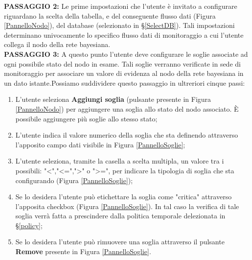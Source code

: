 \pagebreak

\textbf{PASSAGGIO 2:} Le prime impostazioni che l'utente è invitato a configurare riguardano la scelta della tabella, e del conseguente flusso dati (Figura \ref{PannelloNodo}), del database (selezionato in §\ref{SelectDB}). Tali impostazioni determinano univocamente lo specifico flusso dati di monitoraggio a cui l'utente collega il nodo della rete bayesiana.
~\\

\textbf{PASSAGGIO 3:} A questo punto l'utente deve configurare le soglie associate ad ogni possibile stato del nodo in esame. Tali soglie verranno verificate in sede di monitoraggio per associare un valore di evidenza al nodo della rete bayesiana in un dato istante.Possiamo suddividere questo passaggio in ultreriori cinque passi:
\begin{enumerate}
	\item L'utente seleziona \textbf{Aggiungi soglia} (pulsante presente in Figura \ref{PannelloNodo}) per aggiungere una soglia allo stato del nodo associato. È possibile aggiungere più soglie allo stesso stato;
	\item L'utente indica il valore numerico della soglia che sta definendo attraverso l'apposito campo dati visibile in Figura \ref{PannelloSoglie};
	\item L'utente seleziona, tramite la casella a scelta multipla, un valore tra i possibili: "<","<=",">" o ">=", per indicare la tipologia di soglia che sta configurando (Figura \ref{PannelloSoglie});
	\item Se lo desidera l'utente può etichettare la soglia come "critica" attraverso l'apposita checkbox (Figura \ref{PannelloSoglie}). In tal caso la verifica di tale soglia verrà fatta a prescindere dalla politica temporale delezionata in §\ref{policy};
	\item Se lo desidera l'utente può rimuovere una soglia attraverso il pulsante \textbf{Remove} presente in Figura \ref{PannelloSoglie}.
\end{enumerate}

